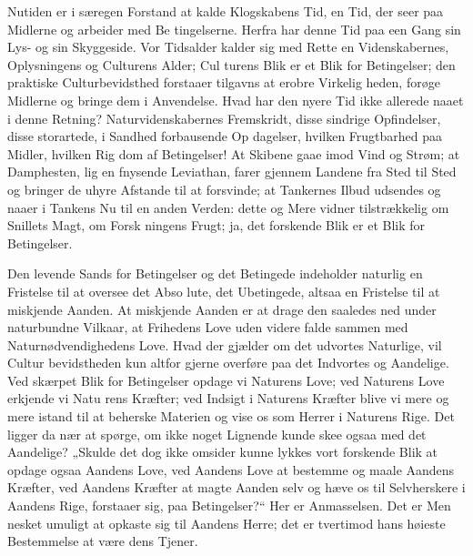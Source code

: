 \documentclass[12pt]{book}
\newcommand{\opage}[1]{\marginnote{\footnotesize\textit{[#1]}}}
\begin{document}
Nutiden er i særegen Forstand at kalde Klogskabens
Tid, en Tid, der seer paa Midlerne og arbeider med Be\-%
tingelserne. Herfra har denne Tid paa een Gang sin Lys- og
sin Skyggeside. Vor Tidsalder kalder sig med Rette en
Videnskabernes, Oplysningens og Culturens Alder; Cul\-%
turens Blik er et Blik for Betingelser; den praktiske
Culturbevidsthed forstaaer tilgavns at erobre Virkelig\-%
heden, forøge Midlerne og bringe dem i Anvendelse.
Hvad har den nyere Tid ikke allerede naaet i denne
Retning? Naturvidenskabernes Fremskridt, disse sindrige
Opfindelser, disse storartede, i Sandhed forbausende Op\-%
dagelser, hvilken Frugtbarhed paa Midler, hvilken Rig\-%
dom af Betingelser! At Skibene gaae imod Vind og
Strøm; at Damphesten, lig en fnysende Leviathan, farer
gjennem Landene fra Sted til Sted og bringer de uhyre
Afstande til at forsvinde; at Tankernes Ilbud udsendes
\opage{4}\setcounter{footnote}{0}%
og naaer i Tankens Nu til en anden Verden: dette og
Mere vidner tilstrækkelig om Snillets Magt, om Forsk\-%
ningens Frugt; ja, det forskende Blik er et Blik for
Betingelser.

Den levende Sands for Betingelser og det Betingede
indeholder naturlig en Fristelse til at oversee det Abso\-%
lute, det Ubetingede, altsaa en Fristelse til at miskjende
Aanden. At miskjende Aanden er at drage den saaledes
ned under naturbundne Vilkaar, at Frihedens Love uden
videre falde sammen med Naturnødvendighedens Love.
Hvad der gjælder om det udvortes Naturlige, vil Cultur\-%
bevidstheden kun altfor gjerne overføre paa det Indvortes
og Aandelige. Ved skærpet Blik for Betingelser opdage
vi Naturens Love; ved Naturens Love erkjende vi Natu\-%
rens Kræfter; ved Indsigt i Naturens Kræfter blive vi
mere og mere istand til at beherske Materien og vise
os som Herrer i Naturens Rige. Det ligger da nær at
spørge, om ikke noget Lignende kunde skee ogsaa med
det Aandelige? „Skulde det dog ikke omsider kunne
lykkes vort forskende Blik at opdage ogsaa Aandens
Love, ved Aandens Love at bestemme og maale Aandens
Kræfter, ved Aandens Kræfter at magte Aanden selv og
hæve os til Selvherskere i Aandens Rige, forstaaer sig,
paa Betingelser?“ Her er Anmasselsen. Det er Men\-%
nesket umuligt at opkaste sig til Aandens Herre; det er
tvertimod hans høieste Bestemmelse at være dens Tjener.
\end{document}

